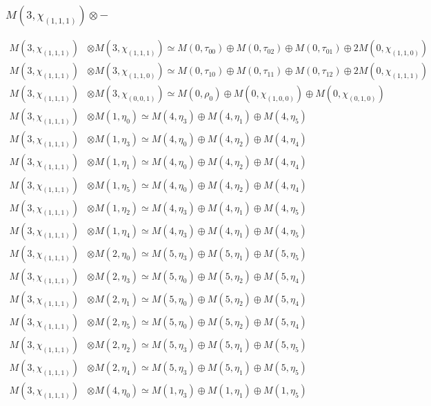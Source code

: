 \subsubsection{$ M(3,\chi_{(1,1,1)})\otimes -$}
\begin{align*}
M(3,\chi_{(1,1,1)}) &\otimes M(3,\chi_{(1,1,1)}) \simeq M(0,\tau_{00}) \oplus M(0,\tau_{02}) \oplus M(0,\tau_{01}) \oplus 2 M(0,\chi_{(1,1,0)})\\
M(3,\chi_{(1,1,1)}) &\otimes M(3,\chi_{(1,1,0)}) \simeq M(0,\tau_{10}) \oplus M(0,\tau_{11}) \oplus M(0,\tau_{12}) \oplus 2 M(0,\chi_{(1,1,1)})\\
M(3,\chi_{(1,1,1)}) &\otimes M(3,\chi_{(0,0,1)}) \simeq M(0,\rho_{0}) \oplus M(0,\chi_{(1,0,0)}) \oplus M(0,\chi_{(0,1,0)})\\
M(3,\chi_{(1,1,1)}) &\otimes M(1,\eta_{0}) \simeq M(4,\eta_{3}) \oplus M(4,\eta_{1}) \oplus M(4,\eta_{5})\\
M(3,\chi_{(1,1,1)}) &\otimes M(1,\eta_{3}) \simeq M(4,\eta_{0}) \oplus M(4,\eta_{2}) \oplus M(4,\eta_{4})\\
M(3,\chi_{(1,1,1)}) &\otimes M(1,\eta_{1}) \simeq M(4,\eta_{0}) \oplus M(4,\eta_{2}) \oplus M(4,\eta_{4})\\
M(3,\chi_{(1,1,1)}) &\otimes M(1,\eta_{5}) \simeq M(4,\eta_{0}) \oplus M(4,\eta_{2}) \oplus M(4,\eta_{4})\\
M(3,\chi_{(1,1,1)}) &\otimes M(1,\eta_{2}) \simeq M(4,\eta_{3}) \oplus M(4,\eta_{1}) \oplus M(4,\eta_{5})\\
M(3,\chi_{(1,1,1)}) &\otimes M(1,\eta_{4}) \simeq M(4,\eta_{3}) \oplus M(4,\eta_{1}) \oplus M(4,\eta_{5})\\
M(3,\chi_{(1,1,1)}) &\otimes M(2,\eta_{0}) \simeq M(5,\eta_{3}) \oplus M(5,\eta_{1}) \oplus M(5,\eta_{5})\\
M(3,\chi_{(1,1,1)}) &\otimes M(2,\eta_{3}) \simeq M(5,\eta_{0}) \oplus M(5,\eta_{2}) \oplus M(5,\eta_{4})\\
M(3,\chi_{(1,1,1)}) &\otimes M(2,\eta_{1}) \simeq M(5,\eta_{0}) \oplus M(5,\eta_{2}) \oplus M(5,\eta_{4})\\
M(3,\chi_{(1,1,1)}) &\otimes M(2,\eta_{5}) \simeq M(5,\eta_{0}) \oplus M(5,\eta_{2}) \oplus M(5,\eta_{4})\\
M(3,\chi_{(1,1,1)}) &\otimes M(2,\eta_{2}) \simeq M(5,\eta_{3}) \oplus M(5,\eta_{1}) \oplus M(5,\eta_{5})\\
M(3,\chi_{(1,1,1)}) &\otimes M(2,\eta_{4}) \simeq M(5,\eta_{3}) \oplus M(5,\eta_{1}) \oplus M(5,\eta_{5})\\
M(3,\chi_{(1,1,1)}) &\otimes M(4,\eta_{0}) \simeq M(1,\eta_{3}) \oplus M(1,\eta_{1}) \oplus M(1,\eta_{5})\\

\end{align*}
